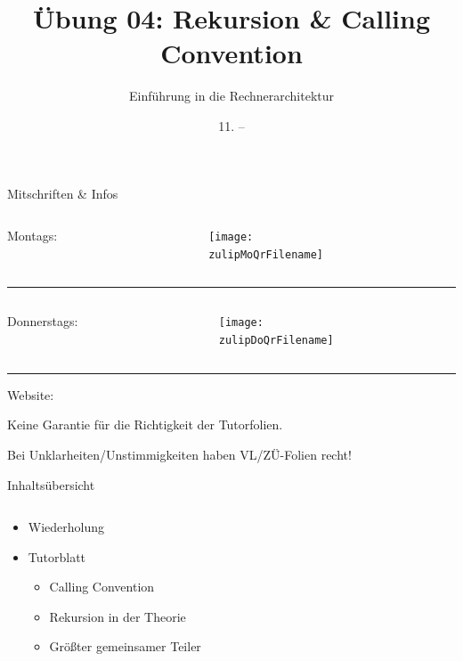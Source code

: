 \documentclass[
  german,            %
  aspectratio=169,    %
]{tumbeamer}
\title{Übung 04: Rekursion \& Calling Convention}
\subtitle{Einführung in die Rechnerarchitektur}
\author{\theAuthorName}
\institute{\theGroupName\\\theSchoolName\\\theUniversityName}
\date{11. -- \DTMdisplaydate{2024}{11}{17}{-1}}
\begin{document}
\maketitle

\begin{frame}[c]{Mitschriften \& Infos}{}
  \begin{minipage}[t]{\textwidth}
    \begin{columns}[c]
      \begin{column}{0.8\textwidth}
        Montags: \href{\zulipMo}{\zulipMo}
      \end{column}
      \begin{column}{0.2\textwidth}
        \texttt{[image: \\zulipMoQrFilename]}
      \end{column}
    \end{columns}
  \end{minipage}
  \rule{\textwidth}{0.4pt}
  \begin{minipage}[t]{\textwidth}
    \begin{columns}[c]
      \begin{column}{0.8\textwidth}
        Donnerstags: \href{\zulipDo}{\zulipDo}
      \end{column}
      \begin{column}{0.2\textwidth}
        \texttt{[image: \\zulipDoQrFilename]}
      \end{column}
    \end{columns}
  \end{minipage}
  \ifdefined\myWebsite
  \rule{\textwidth}{0.4pt}
  \centering
  Website: \href{\myWebsite}{\myWebsite}
  \fi
\end{frame}

\begin{frame}[c]{}{}
  \begin{center}
    \LARGE  Keine Garantie für die Richtigkeit der Tutorfolien.

    \Large Bei Unklarheiten/Unstimmigkeiten haben VL/ZÜ-Folien recht!
  \end{center}
\end{frame}

\begin{frame}[c]{Inhaltsübersicht}{}
  \begin{columns}[c]
    \begin{column}{1\textwidth}
      \begin{itemize}
        \item Wiederholung
        \item Tutorblatt
        \begin{itemize}
          \item Calling Convention
          \item Rekursion in der Theorie
          \item Größter gemeinsamer Teiler
        \end{itemize}
      \end{itemize}
    \end{column}
  \end{columns}
\end{frame}
\end{document}
